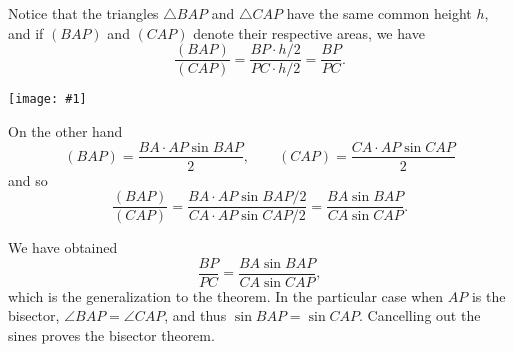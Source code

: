 \documentclass[12pt]{article}
\newcommand{\figuraex}[2]{\begin{center}\texttt{[image: \#1]}\end{center}}
\begin{document}
Notice that the triangles $\triangle BAP$ and $\triangle CAP$ have the same common height $h$, and if $(BAP)$  and $(CAP)$ denote their respective areas, we have
\[
\frac{(BAP)}{(CAP)} = \frac{BP\cdot h/2}{PC\cdot h/2} = \frac{BP}{PC}.
\]
\figuraex{genbisector}{scale=0.75}
On the other hand 
\[(BAP) = \frac{BA\cdot AP \sin BAP}{2},\qquad (CAP)=\frac{CA\cdot AP\sin CAP}{2}\]
and so
\[
\frac{(BAP)}{(CAP)} = \frac{BA\cdot AP \sin BAP/2}{CA\cdot AP\sin CAP/2} =\frac{ BA\sin BAP}{CA\sin CAP}.
\]

We have obtained
\[ \frac{BP}{PC} =\frac{ BA\sin BAP}{CA\sin CAP},\]
which is the generalization to the theorem. In the particular case when $AP$ is the bisector, $\angle BAP = \angle CAP$, and thus $\sin BAP=\sin CAP$. Cancelling out the sines proves the bisector theorem.
\end{document}
